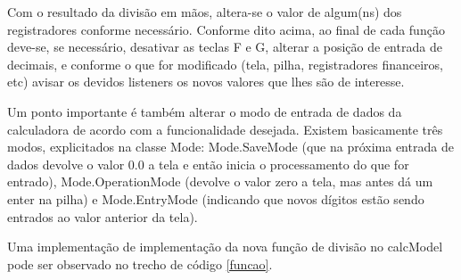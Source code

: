 Com o resultado da divisão em mãos, altera-se o valor de algum(ns) dos registradores conforme necessário. Conforme dito acima, ao final de cada função deve-se, se necessário, desativar as teclas F e G, alterar a posição de entrada de decimais, e conforme o que for modificado (tela, pilha, registradores financeiros, etc) avisar os devidos listeners os novos valores que lhes são de interesse. 

Um ponto importante é também alterar o modo de entrada de dados da calculadora de acordo com a funcionalidade desejada. Existem basicamente três modos, explicitados na classe Mode: Mode.SaveMode (que na próxima entrada de dados devolve o valor 0.0 a tela e então inicia o processamento do que for entrado), Mode.OperationMode (devolve o valor zero a tela, mas antes dá um enter na pilha) e Mode.EntryMode (indicando que novos dígitos estão sendo entrados ao valor anterior da tela). 

Uma implementação de implementação da nova função de divisão no calcModel pode ser observado no trecho de código \ref{funcao}.




% 
%         
%         
%                  

